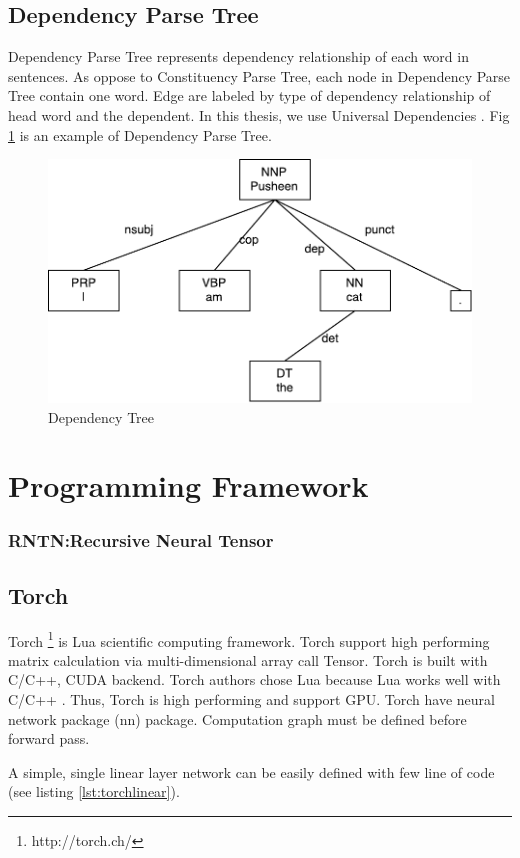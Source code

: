 \subsection{Dependency Parse Tree}
Dependency Parse Tree represents dependency relationship of each word in sentences. As oppose to Constituency Parse Tree, each node in Dependency Parse Tree contain one word. Edge are labeled by type of dependency relationship of head word and the dependent. In this thesis, we use Universal Dependencies \cite{nivre2016universal}. Fig \ref{fig:udexample} is an example of Dependency Parse Tree.

\begin{figure}[H]
    \centering
    \includegraphics[width=0.7\linewidth]{figure/udexample}
    \caption[Dependency Tree]{Dependency Tree}
    \label{fig:udexample}
\end{figure}

\section{Programming Framework}
\subsubsection{RNTN:Recursive Neural Tensor}
\subsection{Torch}\label{sec:torch}
Torch \footnote{http://torch.ch/} is Lua scientific computing framework. Torch support high performing matrix calculation via multi-dimensional array call Tensor. Torch is built with C/C++, CUDA backend. Torch authors chose Lua because Lua works well with C/C++ \cite{collobert2011torch7}.  Thus, Torch is high performing and support GPU. Torch have neural network package (nn) package. Computation graph must be defined before forward pass.

A simple, single linear layer network can be easily defined with few line of code (see listing \ref{lst:torchlinear}).

